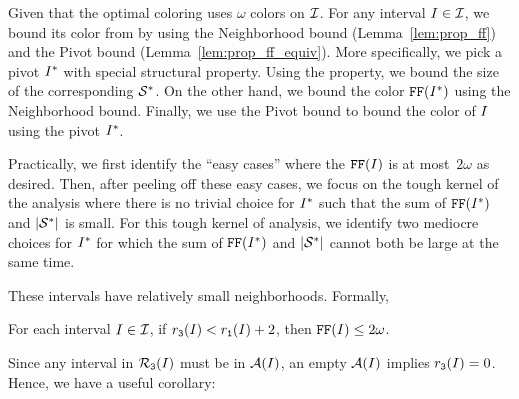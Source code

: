 Given that the optimal coloring uses $\omega$ colors on $\mathcal{I}$. 
For any interval $I \in \mathcal{I}$, we bound its color from \ff by using the Neighborhood bound (Lemma~\ref{lem:prop_ff}) and the Pivot bound (Lemma~\ref{lem:prop_ff_equiv}).
More specifically, we pick a pivot $I^*$ with special structural property. 
Using the property, we bound the size of the corresponding $\mathcal{S}^*$. 
On the other hand, we bound the color $\text{\texttt{FF}}(I^*)$ using the Neighborhood bound. 
Finally, we use the Pivot bound to bound the color of $I$ using the pivot $I^*$.

Practically, we first identify the ``easy cases'' where the $\text{\texttt{FF}}(I)$ is at most~$2\omega$ as desired.
Then, after peeling off these easy cases, we focus on the tough kernel of the analysis where there is no trivial choice for $I^*$ such that the sum of $\text{\texttt{FF}}(I^*)$ and $|\mathcal{S}^*|$ is small.
For this tough kernel of analysis, we identify two mediocre choices for $I^*$ for which the sum of $\text{\texttt{FF}}(I^*)$ and $|\mathcal{S}^*|$ cannot both be large at the same time.

\medskip

These intervals have relatively small neighborhoods. Formally, 
\begin{lemma}
    \label{lem:integral_open_and_closed_assumtion_not_hold}
    For each interval $I \in \mathcal{I}$, 
    if $r_\texttt{3}(I) < r_\texttt{1}(I) + 2$, then $\text{\texttt{FF}}(I) \leq 2\omega$.
\end{lemma}


Since any interval in $\mathcal{R}_\texttt{3}(I)$ must be in $\mathcal{A}(I)$, an empty $\mathcal{A}(I)$ implies $r_\texttt{3}(I) = 0$. 
Hence, we have a useful corollary:

